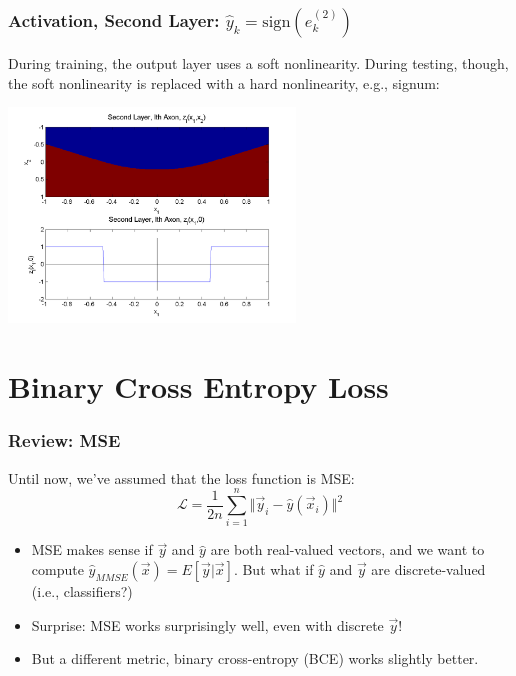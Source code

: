 \documentclass{beamer}
\begin{document}
\begin{frame}
  \frametitle{Activation, Second Layer: $\hat{y}_k=\mbox{sign}(e_k^{(2)})$}

  During  training, the output layer uses  a soft nonlinearity.  During testing, though, the
  soft nonlinearity is replaced with a hard nonlinearity, e.g., signum:
  \centerline{\includegraphics[width=3in]{../lec07/figs/nn_axon2.png}}
\end{frame}

\section[BCE Loss]{Binary Cross Entropy  Loss}
\setcounter{subsection}{1}

\begin{frame}
  \frametitle{Review: MSE}
  
  Until now, we've assumed that the loss function is MSE:
  \[{\mathcal L} = \frac{1}{2n}\sum_{i=1}^n\Vert\vec{y}_{i}-\hat{y}(\vec{x}_i)\Vert^2 \]
  \begin{itemize}
  \item MSE makes sense if $\vec{y}$ and $\hat{y}$ are both
    real-valued vectors, and we want to compute
    $\hat{y}_{MMSE}(\vec{x})=E\left[\vec{y}|\vec{x}\right]$.  But
    what if $\hat{y}$ and $\vec{y}$ are discrete-valued (i.e.,
    classifiers?)
  \item Surprise: MSE works surprisingly well, even with
    discrete $\vec{y}$!
  \item But a different metric, binary cross-entropy (BCE) works
    slightly better.
  \end{itemize}
\end{frame}
\end{document}
